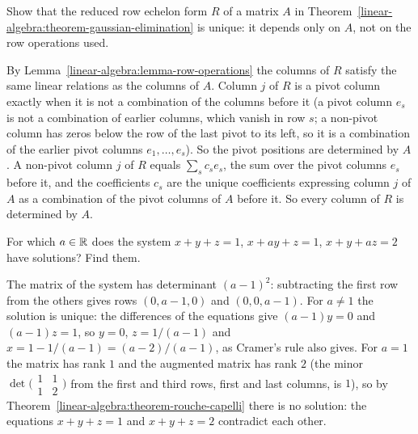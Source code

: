 \begin{exercise}\label{linear-algebra:exercise-rref-unique}
Show that the reduced row echelon form $R$ of a matrix $A$ in Theorem~\ref{linear-algebra:theorem-gaussian-elimination} is unique: it depends only on $A$, not on the row operations used.
\end{exercise}

\begin{solution}
By Lemma~\ref{linear-algebra:lemma-row-operations} the columns of $R$ satisfy the same linear relations as the columns of $A$. Column $j$ of $R$ is a pivot column exactly when it is not a combination
of the columns before it (a pivot column $e_s$ is not a combination of earlier columns, which vanish in row $s$; a non-pivot column has zeros below the row of the last pivot to its left, so it is a
combination of the earlier pivot columns $e_1, \ldots, e_s$). So the pivot positions are determined by $A$. A non-pivot column $j$ of $R$ equals $\sum_sc_se_s$, the sum over the pivot columns
$e_s$ before it, and the coefficients $c_s$ are the unique coefficients expressing column $j$ of $A$ as a combination of the pivot columns of $A$ before it. So every column of $R$ is determined by $A$.
\end{solution}

\begin{exercise}\label{linear-algebra:exercise-system-parameter}
For which $a \in \mathbb{R}$ does the system $x + y + z = 1$, $x + ay + z = 1$, $x + y + az = 2$ have solutions? Find them.
\end{exercise}

\begin{solution}
The matrix of the system has determinant $(a - 1)^2$: subtracting the first row from the others gives rows $(0, a - 1, 0)$ and $(0, 0, a - 1)$. For $a \neq 1$ the solution is unique: the differences of
the equations give $(a - 1)y = 0$ and $(a - 1)z = 1$, so $y = 0$, $z = 1/(a - 1)$ and $x = 1 - 1/(a - 1) = (a - 2)/(a - 1)$, as Cramer's rule also gives. For $a = 1$ the matrix has rank $1$ and the
augmented matrix has rank $2$ (the minor $\det\bigl(\begin{smallmatrix}1 & 1\\ 1 & 2\end{smallmatrix}\bigr)$ from the first and third rows, first and last columns, is $1$), so by
Theorem~\ref{linear-algebra:theorem-rouche-capelli} there is no solution: the equations $x + y + z = 1$ and $x + y + z = 2$ contradict each other.
\end{solution}

